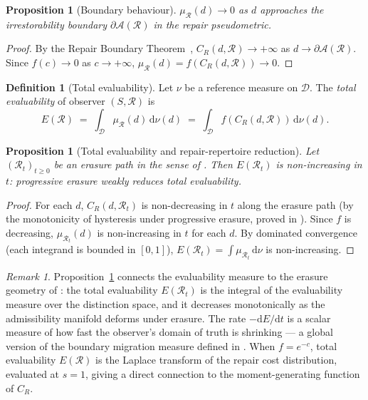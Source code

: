 \documentclass[12pt, oneside]{article}
\theoremstyle{plain}
\newtheorem{proposition}[theorem]{Proposition}
\theoremstyle{definition}
\newtheorem{definition}[theorem]{Definition}
\theoremstyle{remark}
\newtheorem{remark}[theorem]{Remark}
\newcommand{\CR}{C_{\!R}}
\newcommand{\AO}{\mathcal{A}}
\newcommand{\Dsub}{\mathcal{D}}
\begin{document}
\begin{proposition}[Boundary behaviour]
  $\mu_{\mathcal{R}}(d) \to 0$ as $d$ approaches the
  irrestorability boundary $\partial\AO(\mathcal{R})$ in the
  repair pseudometric.
  \label{prop:measure-boundary}
\end{proposition}

\begin{proof}
  By the Repair Boundary Theorem~\cite{Flyxion2026a},
  $\CR(d, \mathcal{R}) \to +\infty$ as $d \to \partial\AO(\mathcal{R})$.
  Since $f(c) \to 0$ as $c \to +\infty$,
  $\mu_{\mathcal{R}}(d) = f(\CR(d, \mathcal{R})) \to 0$.
\end{proof}

\begin{definition}[Total evaluability]
  Let $\nu$ be a reference measure on $\Dsub$.
  The \emph{total evaluability} of observer $(S, \mathcal{R})$ is
  \[
    E(\mathcal{R})
    \;=\;
    \int_{\Dsub} \mu_{\mathcal{R}}(d)\, \mathrm{d}\nu(d)
    \;=\;
    \int_{\Dsub} f(\CR(d, \mathcal{R}))\, \mathrm{d}\nu(d).
  \]
\end{definition}

\begin{proposition}[Total evaluability and repair-repertoire reduction]
  Let $(\mathcal{R}_t)_{t \geq 0}$ be an erasure path in the sense
  of \cite{Flyxion2026b}.
  Then $E(\mathcal{R}_t)$ is non-increasing in $t$:
  progressive erasure weakly reduces total evaluability.
  \label{prop:total-ev-decreasing}
\end{proposition}

\begin{proof}
  For each $d$, $\CR(d, \mathcal{R}_t)$ is non-decreasing in $t$
  along the erasure path (by the monotonicity of hysteresis under
  progressive erasure, proved in \cite{Flyxion2026b}).
  Since $f$ is decreasing, $\mu_{\mathcal{R}_t}(d)$ is non-increasing
  in $t$ for each $d$.
  By dominated convergence (each integrand is bounded in $[0,1]$),
  $E(\mathcal{R}_t) = \int \mu_{\mathcal{R}_t}\, \mathrm{d}\nu$ is
  non-increasing.
\end{proof}

\begin{remark}
  Proposition~\ref{prop:total-ev-decreasing} connects the evaluability
  measure to the erasure geometry of \cite{Flyxion2026b}: the total
  evaluability $E(\mathcal{R}_t)$ is the integral of the evaluability
  measure over the distinction space, and it decreases monotonically
  as the admissibility manifold deforms under erasure.
  The rate $-\mathrm{d}E/\mathrm{d}t$ is a scalar measure of how fast
  the observer's domain of truth is shrinking --- a global version of
  the boundary migration measure defined in \cite{Flyxion2026b}.
  When $f = e^{-c}$, total evaluability $E(\mathcal{R})$ is the
  Laplace transform of the repair cost distribution, evaluated at $s=1$,
  giving a direct connection to the moment-generating function of $\CR$.
\end{remark}
\end{document}
